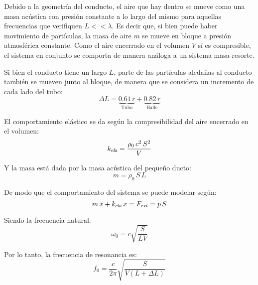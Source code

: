 \documentclass[a5paper,12pt,twoside]{book}
\begin{document}
\begin{center}
    \def\svgwidth{0.8\linewidth}
    
\end{center}

Debido a la geometría del conducto, el aire que hay dentro se mueve como una masa acústica con presión constante a lo largo del mismo para aquellas frecuencias que verifiquen $L<<\lambda$. Es decir que, si bien puede haber movimiento de partículas, la masa de aire $m$ se mueve en bloque a presión atmosférica constante. Como el aire encerrado en el volumen $V$ sí es compresible, el sistema en conjunto se comporta de manera análoga a un sistema masa-resorte.

Si bien el conducto tiene un largo $L$, parte de las partículas aledañas al conducto también se mueven junto al bloque, de manera que se considera un incremento de cada lado del tubo:
\begin{equation*}
    \Delta L = \underbrace{0.61 \, r}_{\text{Tubo}} + \underbrace{0.82 \, r}_{\text{Bafle}}
\end{equation*}

El comportamiento elástico se da según la compresibilidad del aire encerrado en el volumen:
\begin{equation*}
    {{k}_\textsl{{ela}}} = \frac{\rho_0 \, c^2 \, S^2}{V}
\end{equation*}

Y la masa está dada por la masa acústica del pequeño ducto:
\begin{equation*}
    m = \rho_0 \, S \, L
\end{equation*}

De modo que el comportamiento del sistema se puede modelar según:
\begin{equation*}
    m \, \ddot{x} + {{k}_\textsl{{ela}}} \, x = {{F}_\textsl{{ext}}} = p \, S
\end{equation*}

Siendo la frecuencia natural:
\begin{equation*}
    \omega_0 = c \sqrt{\frac{S}{LV}}
\end{equation*}

Por lo tanto, la frecuencia de resonancia es:
\begin{equation*}
    f_0 = \frac{c}{2\pi} \sqrt{\frac{S}{V \left( L+ \Delta L \right)}}
\end{equation*}
\end{document}
